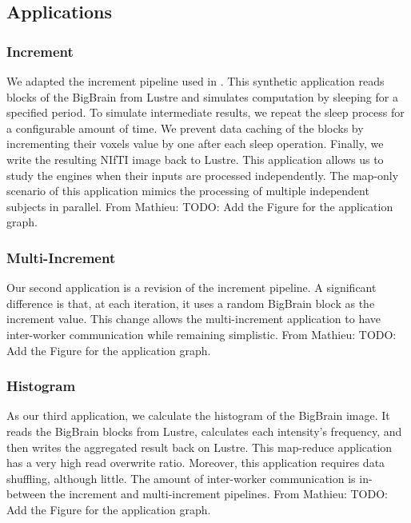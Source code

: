 \documentclass[conference]{IEEEtran}
\newcommand{\MD}[1]{\color{magenta}From Mathieu: #1 \color{black}}
\begin{document}
\subsection{Applications}
\subsubsection{Increment}
We adapted the increment pipeline used in \cite{hayot2019performance}.
This synthetic application reads blocks of the BigBrain from Lustre and simulates computation by sleeping for a specified period.
To simulate intermediate results, we repeat the sleep process for a configurable amount of time.
We prevent data caching of the blocks by incrementing their voxels value by one after each sleep operation.
Finally, we write the resulting NIfTI image back to Lustre.
This application allows us to study the engines when their inputs are processed independently.
The map-only scenario of this application mimics the processing of multiple independent subjects in parallel.
\MD{TODO: Add the Figure for the application graph.}
	
\subsubsection{Multi-Increment}
Our second application is a revision of the increment pipeline.
A significant difference is that, at each iteration, it uses a random BigBrain block as the increment value. 
This change allows the multi-increment application to have inter-worker communication while remaining simplistic.
\MD{TODO: Add the Figure for the application graph.}
	
\subsubsection{Histogram}
As our third application, we calculate the histogram of the BigBrain image. 
It reads the BigBrain blocks from Lustre, calculates each intensity's frequency, and then writes the aggregated result back on Lustre.
This map-reduce application has a very high read overwrite ratio.
Moreover, this application requires data shuffling, although little. 
The amount of inter-worker communication is in-between the increment and multi-increment pipelines.
\MD{TODO: Add the Figure for the application graph.}
	
\end{document}
